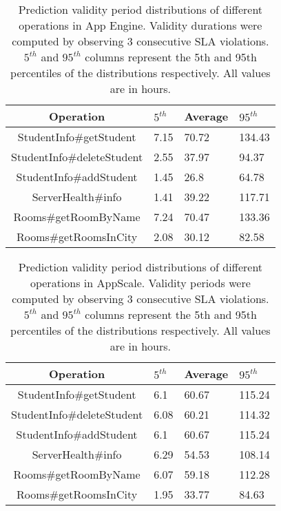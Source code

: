 \begin{table}
\caption{Prediction validity period distributions of different operations in
App Engine. Validity durations were computed by observing $3$ consecutive SLA
violations. $5^{th}$ and $95^{th}$ columns represent the 5th and 95th 
percentiles of the
distributions respectively. All values are in hours.
\label{tab:gae_validity}
}
\begin{center}
\begin{tabular}{|c|p{2cm}|p{2cm}|p{2cm}|}
\hline
Operation & $5^{th}$ & Average & $95^{th}$ \\ \hline
StudentInfo\#getStudent & 7.15 & 70.72 & 134.43 \\ \hline
StudentInfo\#deleteStudent & 2.55 & 37.97 & 94.37 \\ \hline
StudentInfo\#addStudent & 1.45 & 26.8 & 64.78 \\ \hline
ServerHealth\#info & 1.41 & 39.22 & 117.71 \\ \hline
Rooms\#getRoomByName & 7.24 & 70.47 & 133.36 \\ \hline
Rooms\#getRoomsInCity & 2.08 & 30.12 & 82.58 \\ \hline
\end{tabular}
\end{center}
\vspace{-0.1in}
\end{table}

\begin{table}
\caption{Prediction validity period distributions of different operations in
AppScale. Validity periods were computed by observing $3$ consecutive SLA
violations. $5^{th}$ and $95^{th}$ 
columns represent the 5th and 95th percentiles of the
distributions respectively. All values are in hours.
\label{tab:as_validity}
}
\begin{center}
\begin{tabular}{|c|p{2cm}|p{2cm}|p{2cm}|}
\hline
Operation & $5^{th}$ & Average & $95^{th}$ \\ \hline
StudentInfo\#getStudent & 6.1 & 60.67 & 115.24 \\ \hline
StudentInfo\#deleteStudent & 6.08 & 60.21 & 114.32 \\ \hline
StudentInfo\#addStudent & 6.1 & 60.67 & 115.24 \\ \hline
ServerHealth\#info & 6.29 & 54.53 & 108.14 \\ \hline
Rooms\#getRoomByName & 6.07 & 59.18 & 112.28 \\ \hline
Rooms\#getRoomsInCity & 1.95 & 33.77 & 84.63 \\ \hline
\end{tabular}
\end{center}
\vspace{-0.2in}
\end{table}

